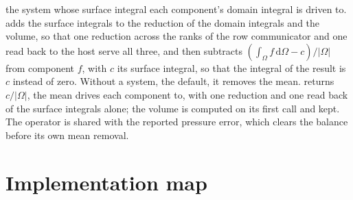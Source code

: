 \begin{description}
    the system whose surface integral each component's domain integral is
    driven to.  adds the surface integrals to the reduction of
    the domain integrals and the volume, so that one reduction across the
    ranks of the row communicator and one read back to the host serve all
    three, and then subtracts
    \((\int_\Omega f\,\mathrm d\Omega-c)/\lvert\Omega\rvert\) from
    component \(f\), with \(c\) its surface integral, so that the integral of
    the result is \(c\) instead of zero. Without a system, the default, it
    removes the mean.  returns
    \(c/\lvert\Omega\rvert\), the mean  drives each component
    to, with one reduction and one read back of the surface integrals
    alone; the volume is computed on its first call and kept. The operator
    is shared with the reported pressure error, which clears the balance
    before its own mean removal.
\end{description}

\section{Implementation map}

